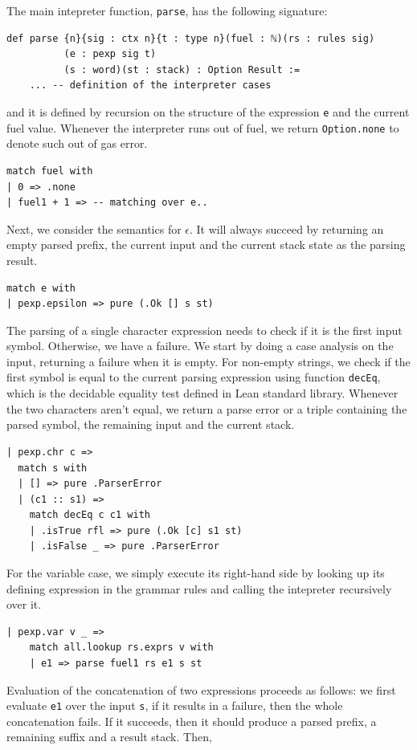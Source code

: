 \documentclass[preprint,12pt]{elsarticle}
\theoremstyle{definition}
\begin{document}
The main intepreter function, \lstinline|parse|, has the following signature:
\begin{lstlisting}
def parse {n}{sig : ctx n}{t : type n}(fuel : ℕ)(rs : rules sig)
          (e : pexp sig t)
          (s : word)(st : stack) : Option Result :=
    ... -- definition of the interpreter cases
\end{lstlisting}
and it is defined by recursion on the structure of the expression \lstinline|e|
and the current fuel value. Whenever the interpreter runs out of fuel, we return
\lstinline|Option.none| to denote such out of gas error.
\begin{lstlisting}
match fuel with
| 0 => .none
| fuel1 + 1 => -- matching over e..
\end{lstlisting}
Next, we consider the semantics for $\epsilon$. It will always succeed by
returning an empty parsed prefix, the current input and the current
stack state as the parsing result.
\begin{lstlisting}
match e with
| pexp.epsilon => pure (.Ok [] s st)
\end{lstlisting}
The parsing of a single character expression needs to check if
it is the first input symbol. Otherwise, we have a failure.
We start by doing a case analysis on the input, returning a
failure when it is empty. For non-empty strings, we check if
the first symbol is equal to the current parsing expression
using function \lstinline|decEq|, which is the decidable
equality test defined in Lean standard library. Whenever the
two characters aren't equal, we return a parse error or a
triple containing the parsed symbol, the remaining input and
the current stack.
\begin{lstlisting}
| pexp.chr c =>
  match s with
  | [] => pure .ParserError
  | (c1 :: s1) =>
    match decEq c c1 with
    | .isTrue rfl => pure (.Ok [c] s1 st)
    | .isFalse _ => pure .ParserError
\end{lstlisting}
For the variable case, we simply execute its right-hand side by
looking up its defining expression in the grammar rules and calling
the intepreter recursively over it.
\begin{lstlisting}
| pexp.var v _ =>
    match all.lookup rs.exprs v with
    | e1 => parse fuel1 rs e1 s st
\end{lstlisting}
Evaluation of the concatenation of two expressions proceeds as follows:
we first evaluate \lstinline|e1| over the input \lstinline|s|, if it results
in a failure, then the whole concatenation fails. If it succeeds, then it
should produce a parsed prefix, a remaining suffix and a result stack. Then,
\end{document}

